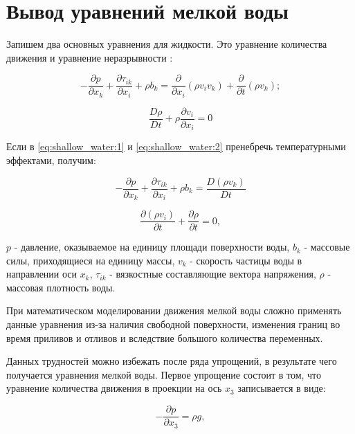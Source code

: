 \documentclass[14pt]{extreport}
\begin{document}
 
\chapter{Вывод уравнений мелкой воды}

Запишем два основных уравнения для жидкости. Это уравнение количества движения и уравнение неразрывности \cite{bib:fem:konor}:

\begin{equation}\label{eq:shallow_water:1}
-\frac{\partial p}{\partial x_k} + \frac{\partial \tau_{ik}}{\partial x_i} + \rho b_k = \frac{\partial}{\partial x_i}(\rho v_i v_k) + \frac{\partial}{\partial t}(\rho v_k);
\end{equation}

\begin{equation}\label{eq:shallow_water:2}
\frac{D\rho}{Dt}+\rho \frac{\partial v_i}{\partial x_i} =0
\end{equation}

Если в \ref{eq:shallow_water:1} и \ref{eq:shallow_water:2} пренебречь температурными эффектами, получим:

\begin{equation}\label{eq:shallow_water:3}
-\frac{\partial p}{\partial x_k} + \frac{\partial \tau_{ik}}{\partial x_i} + \rho b_k = \frac{D(\rho v_k)}{Dt}
\end{equation}

\begin{equation}\label{eq:shallow_water:4}
\frac{\partial (\rho v_i)}{\partial t} + \frac{\partial \rho}{\partial t}=0,
\end{equation}

 $ p $ - давление, оказываемое на единицу площади поверхности воды, $ b_k $ - массовые силы, приходящиеся на единицу массы, $v_k$ - скорость частицы воды в направлении оси $x_k$, $\tau_{ik}$ - вязкостные составляющие вектора напряжения, $ \rho $ - массовая плотность воды.

При математическом моделировании движения мелкой воды сложно применять данные уравнения из-за наличия свободной поверхности, изменения границ во время приливов и отливов и вследствие большого количества переменных.

Данных трудностей можно избежать после ряда упрощений, в результате чего получается уравнения мелкой воды. Первое упрощение состоит в том, что уравнение количества движения в проекции на ось $x_3$ записывается в виде:

\begin{equation}\label{eq:shallow_water:5}
-\frac{\partial p}{\partial x_3}=\rho g, 
\end{equation}
\end{document}
